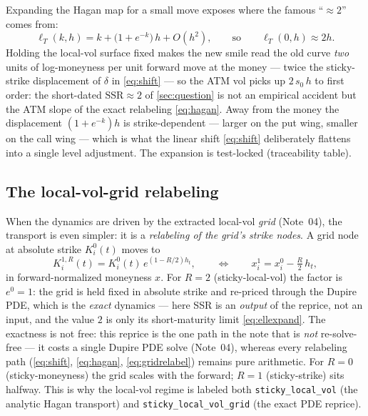\documentclass[11pt]{article}
\begin{document}
Expanding the Hagan map for a small move exposes where the famous ``$\approx2$''
comes from:
\begin{equation}
\ell_T(k,h)=k+\big(1+e^{-k}\big)\,h+O(h^2),
\qquad\text{so}\qquad
\ell_T(0,h)\approx 2h .
\label{eq:ellexpand}
\end{equation}
Holding the local-vol surface fixed makes the new smile read the old curve
\emph{two} units of log-moneyness per unit forward move at the money --- twice the
sticky-strike displacement of $\delta$ in \eqref{eq:shift} --- so the ATM vol picks
up $2\,s_0\,h$ to first order: the short-dated $\mathrm{SSR}\approx2$ of
\cref{sec:question} is not an empirical accident but the ATM slope of the exact
relabeling \eqref{eq:hagan}. Away from the money the displacement $(1+e^{-k})h$ is
strike-dependent --- larger on the put wing, smaller on the call wing --- which is
what the linear shift \eqref{eq:shift} deliberately flattens into a single level
adjustment. The expansion is test-locked (traceability table).

\subsection{The local-vol-grid relabeling}

When the dynamics are driven by the extracted local-vol \emph{grid} (Note~04), the
transport is even simpler: it is a \emph{relabeling of the grid's strike nodes}. A
grid node at absolute strike $K_i^0(t)$ moves to
\begin{equation}
K_i^{1,R}(t)=K_i^0(t)\,e^{(1-R/2)h_t},
\qquad\Longleftrightarrow\qquad
x_i^1=x_i^0-\tfrac{R}{2}\,h_t,
\label{eq:gridrelabel}
\end{equation}
in forward-normalized moneyness $x$. For $R=2$ (sticky-local-vol) the factor is
$e^{0}=1$: the grid is held fixed in absolute strike and re-priced through the
Dupire PDE, which is the \emph{exact} dynamics --- here SSR is an \emph{output} of
the reprice, not an input, and the value $2$ is only its short-maturity limit
\eqref{eq:ellexpand}. The exactness is not free: this reprice is the one path in
the note that is \emph{not} re-solve-free --- it costs a single Dupire PDE solve
(Note~04), whereas every relabeling path (\eqref{eq:shift}, \eqref{eq:hagan},
\eqref{eq:gridrelabel}) remains pure arithmetic. For
$R=0$ (sticky-moneyness) the grid scales with the forward; $R=1$ (sticky-strike)
sits halfway. This is why the local-vol regime is labeled both
\texttt{sticky\_local\_vol} (the analytic Hagan transport) and
\texttt{sticky\_local\_vol\_grid} (the exact PDE reprice).
\end{document}
